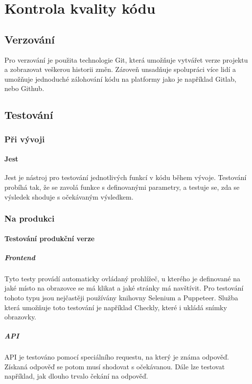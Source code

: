 \chapter{Kontrola kvality kódu}
\section{Verzování}
Pro verzování je použita technologie Git,
která umožňuje vytvářet verze projektu
a zobrazovat veškerou historii změn.
Zároveň unsadňuje spolupráci více lidí a umožňuje
jednoduché zálohování kódu na platformy jako je
například Gitlab, nebo Github.

\section{Testování}
\subsection{Při vývoji}
\subsubsection{Jest}
Jest je nástroj pro testování jednotlivých funkcí v kódu během vývoje.
Testování probíhá tak, že se zavolá funkce s definovanými parametry,
a testuje se, zda se výsledek shoduje s očekávaným výsledkem.
\subsection{Na produkci}
\subsubsection{Testování produkční verze}
\paragraph{Frontend}
Tyto testy provádí automaticky ovládaný prohlížeč, u kterého je 
definované na jaké místo na obrazovce se má klikat a jaké stránky má navštívit.
Pro testování tohoto typu jsou nejčastěji používány knihovny Selenium a Puppeteer.
Služba která umožňuje toto testování je například Checkly, které i ukládá snímky obrazovky.
\paragraph{API}
API je testováno pomocí speciálního requestu, na který je známa odpověď. Získaná
odpověď se potom musí shodovat s očekávanou. Dále lze testovat například, jak dlouho
trvalo čekání na odpověď.
